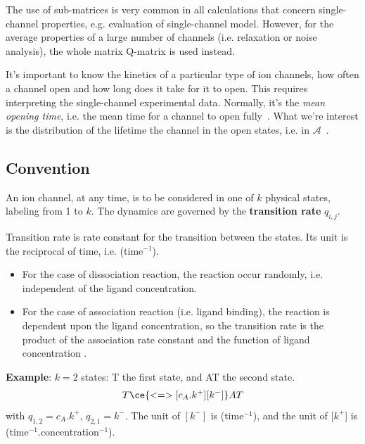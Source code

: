 The use of sub-matrices is very common in all calculations that
concern single-channel properties, e.g. evaluation of single-channel
model. However, for the average properties of a large number of
channels (i.e. relaxation or noise analysis), the whole matrix
Q-matrix is used instead.



It's important to know the kinetics of a particular type of ion
channels, how often a channel open and how long does it take for it to
open. This requires interpreting the single-channel experimental
data. Normally, it's the {\it mean opening time}, i.e. the mean time
for a channel to open fully~\citep{magleby1990ekp}.  What we're
interest is the distribution of the lifetime the channel in the open
states, i.e. in $\mathcal{A}$~\citep{colquhoun1981sps}.



\subsection{Convention}
\label{sec:convention}

An ion channel, at any time, is to be considered in one of $k$
physical states, labeling from 1 to $k$. The dynamics are governed by
the {\bf transition rate} $q_{i,j}$.
\begin{framed}
  Transition rate is rate constant for the transition between the
  states. Its unit is the reciprocal of time, i.e. (time$^{-1}$).
  \begin{itemize}
  \item For the case of dissociation reaction, the reaction occur
    randomly, i.e. independent of the ligand concentration.

  \item For the case of association reaction (i.e. ligand binding),
    the reaction is dependent upon the ligand concentration, so the
    transition rate is the product of the association rate constant
    and the function of ligand concentration .
  \end{itemize}
\end{framed}

{\bf Example}: $k=2$ states: T the first state, and AT the second
state.
\begin{equation*}
 T \ce{<=>[c_A.k^+][k^-]} AT
\end{equation*}
with $q_{1,2}=c_A.k^+$, $q_{2,1}=k^-$. The unit of $[k^-]$ is
(time$^{-1}$), and the unit of [$k^+$] is
(time$^{-1}$.concentration$^{-1}$).

